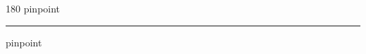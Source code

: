 
\begin{frame}
\begin{center}
\begin{turn}{180}
{\fontsize{2.5cm}{1em}\selectfont pinpoint}
\end{turn}
\vspace{1em}\par  
\hrule
\vspace{1em}\par  
{\fontsize{2.5cm}{1em}\selectfont pinpoint}
\end{center}
\end{frame}
